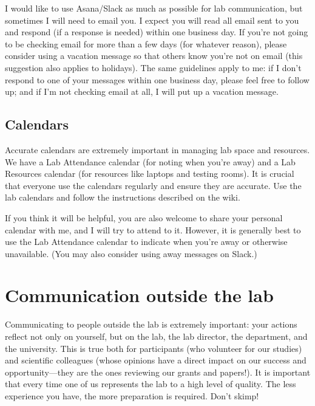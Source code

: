\documentclass[letterpaper,12pt,oneside]{memoir}
\begin{document}
I would like to use Asana/Slack as much as possible for lab communication, but sometimes I will need to email you. I expect you will read all email sent to you and respond (if a response is needed) within one business day. If you're not going to be checking email for more than a few days (for whatever reason), please consider using a vacation message so that others know you're not on email (this suggestion also applies to holidays). The same guidelines apply to me: if I don't respond to one of your messages within one business day, please feel free to follow up; and if I'm not checking email at all, I will put up a vacation message. 


\subsection{Calendars}
Accurate calendars are extremely important in managing lab space and resources. We have a Lab Attendance calendar (for noting when you're away) and a Lab Resources calendar (for resources like laptops and testing rooms). It is crucial that everyone use the calendars regularly and ensure they are accurate. Use the lab calendars and follow the instructions described on the wiki.

If you think it will be helpful, you are also welcome to share your personal calendar with me, and I will try to attend to it. However, it is generally best to use the Lab Attendance calendar to indicate when you're away or otherwise unavailable. (You may also consider using away messages on Slack.)






\section{Communication outside the lab}

Communicating to people outside the lab is extremely important: your actions reflect not only on yourself, but on the lab, the lab director, the department, and the university. This is true both for participants (who volunteer for our studies) and scientific colleagues (whose opinions have a direct impact on our success and opportunity---they are the ones reviewing our grants and papers!). It is important that every time one of us represents the lab to a high level of quality. The less experience you have, the more preparation is required. Don't skimp!
\end{document}
